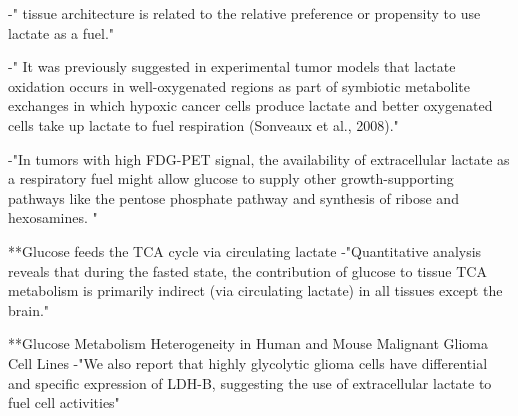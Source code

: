 \documentclass[11pt,a4paper]{article}
\begin{document}
-" tissue architecture is related to the relative preference or propensity to use lactate as a fuel."

-" It was previously suggested in experimental tumor models that lactate oxidation occurs in well-oxygenated regions as part of symbiotic metabolite exchanges in which hypoxic cancer cells produce lactate and better oxygenated cells take up lactate to fuel respiration (Sonveaux et al., 2008)."

-"In tumors with high FDG-PET signal, the availability of extracellular lactate as a respiratory fuel might allow glucose to supply other growth-supporting pathways like the pentose phosphate pathway and synthesis of ribose and hexosamines. "



**Glucose feeds the TCA cycle via circulating lactate
-"Quantitative analysis reveals that during the fasted state, the contribution of glucose to tissue TCA metabolism is primarily indirect (via circulating lactate) in all tissues except the brain."


**Glucose Metabolism Heterogeneity in Human and Mouse Malignant Glioma Cell Lines
-"We also report that highly glycolytic glioma cells have differential and specific expression of LDH-B, suggesting the use of extracellular lactate to fuel cell activities"
\end{document}
